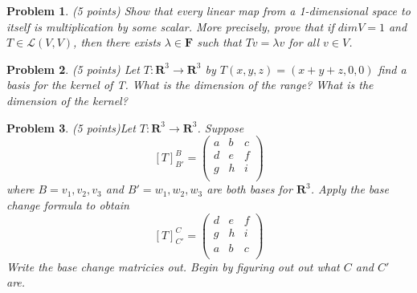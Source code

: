\documentclass{article}
\theoremstyle{problemstyle}
\newtheorem{problem}{Problem}
\theoremstyle{problemstyle}
\newtheorem{solution}{Solution}
\theoremstyle{problemstyle}
\begin{document}
\begin{problem}
(5 points) Show that every linear map from a 1-dimensional space to itself is multiplication by some scalar. More precisely, prove that if $dim V = 1$ and $T \in \mathscr{L}(V,V)$, then there exists $\lambda \in \textbf{F}$ such that $Tv = \lambda v$ for all $v \in V$. 
\end{problem}


\begin{problem}
(5 points) Let $T:\textbf{R}^3 \rightarrow \textbf{R}^3$ by $T(x,y,z) = (x+y+z,0,0)$ find a basis for the kernel of T. What is the dimension of the range? What is the dimension of the kernel?
\end{problem}


\begin{problem}
(5 points)Let $T:\textbf{R}^3 \rightarrow \textbf{R}^3$. Suppose 
$$[T]^{B}_{B'} = 
\begin{pmatrix} a & b & c  \\
 d & e& f   \\
  g & h& i   \\
\end{pmatrix}$$ 
where $B = v_1,v_2,v_3$ and $B' = w_1,w_2,w_3$ are both bases for $\textbf{R}^3$. Apply the base change formula to obtain $$[T]^{C}_{C'} = 
\begin{pmatrix} 
 d & e & f   \\
 g & h & i   \\
 a & b & c  \\
\end{pmatrix}$$ 
Write the base change matricies out. Begin by figuring out out what $C$ and $C'$ are. 
\end{problem}
\end{document}

